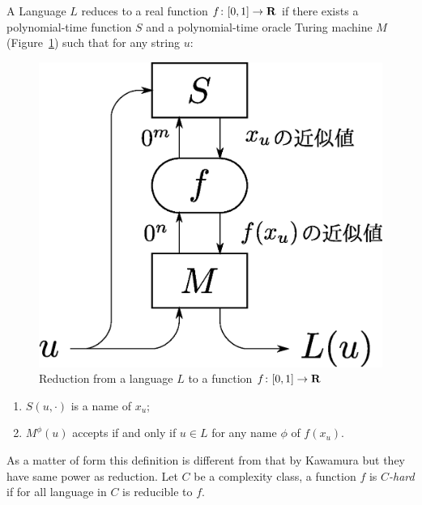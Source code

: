 \begin{definition}[Reduction]
 A Language $L$ reduces to a real function $f \colon [0, 1] \to \mathbf R$
 if there exists a polynomial-time function $S$ and a polynomial-time oracle Turing machine $M$ (Figure~\ref{fig:reduction})
 such that for any string $u$:
 \begin{figure}
  \begin{center}
  \includegraphics[scale=0.25]{image/reduction.eps}
  \caption{Reduction from a language $L$ to a function $f \colon [0,1] \to \mathbf R$}
  \label{fig:reduction}
  \end{center}
 \end{figure}
  \begin{enumerate}
   \item $S(u, \cdot)$ is a name of $x_u$;
   \item $M^\phi(u)$ accepts if and only if $u \in L$ for any name $\phi$ of $f(x_u)$.
  \end{enumerate}
\end{definition}
As a matter of form this definition is different from 
that by Kawamura but they have same power as reduction.
Let $C$ be a complexity class, a function $f$ is \emph{$C$-hard}
if for all language in $C$ is reducible to $f$.
